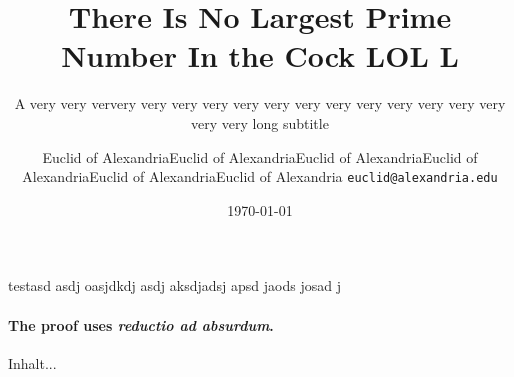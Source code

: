 \documentclass[aspectratio=43]{beamer}
\title{There Is No Largest Prime Number In the Cock LOL L}
\subtitle{A very very ververy very very very very very very very very very very very very very very long subtitle}
\date{\today}
\author[Euclid]{Euclid of AlexandriaEuclid of AlexandriaEuclid of AlexandriaEuclid of AlexandriaEuclid of AlexandriaEuclid of Alexandria \texttt{euclid@alexandria.edu}}
\begin{document}
	

\begin{frame}
\titlepage
\end{frame}

\begin{frame}{testasd asdj oasjdkdj asdj aksdjadsj apsd jaods josad j}
	
	\framesubtitle{The proof uses \textit{reductio ad absurdum}.} 
	Inhalt...
\end{frame}
\end{document}
